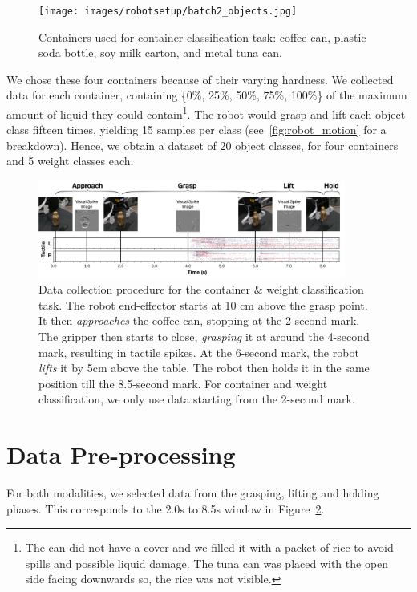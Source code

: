 \documentclass[fyp]{socreport}
\begin{document}
\begin{figure}
\centering
\texttt{[image: images/robotsetup/batch2\_objects.jpg]}
\caption{Containers used for container classification task:
  coffee can, plastic soda bottle, soy milk carton, and metal tuna can.
  \label{fig:expobjects}}
\end{figure}

We chose these four containers because of their varying hardness. We collected
data for each container, containing \{0\%, 25\%, 50\%, 75\%, 100\%\} of the
maximum amount of liquid they could contain\footnote{The can did not have a
  cover and we filled it with a packet of rice to avoid spills and possible
  liquid damage. The tuna can was placed with the open side facing downwards so,
  the rice was not visible.}. The robot would grasp and lift each object class
fifteen times, yielding 15 samples per class (see~\autoref{fig:robot_motion} for
a breakdown). Hence, we obtain a dataset of 20 object classes, for four
containers and 5 weight classes each.

\begin{figure}
\centering
\includegraphics[width=0.90\textwidth]{images/robotsetup/RobotMotion_Exp1.pdf}
\caption{Data collection procedure for the container \& weight classification
  task. The robot end-effector starts at 10 cm above the grasp point. It then
  \emph{approaches} the coffee can, stopping at the 2-second mark. The gripper
  then starts to close, \emph{grasping} it at around the 4-second mark,
  resulting in tactile spikes. At the 6-second mark, the robot \emph{lifts} it
  by 5cm above the table. The robot then holds it in the same position till the
  8.5-second mark. For container and weight classification, we only use data
  starting from the 2-second mark.\label{fig:robot_motion}}
\end{figure}

\section{Data Pre-processing}

For both modalities, we selected data from the grasping, lifting and holding
phases. This corresponds to the 2.0s to 8.5s window in
Figure~\ref{fig:robot_motion}.
\end{document}
